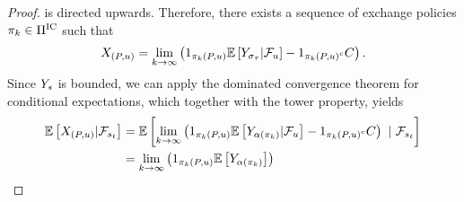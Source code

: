 \begin{proof}
    is directed upwards.
    Therefore, there exists a sequence of exchange policies 
    \(
        \exchangepolicy_k 
        \in\seticexchangepolicies
    \)
    such that 
    \begin{align*}
        \snellenvss{
            \rbr{
                \fixedpath,\nextexchange
            }
        }
        =
        \lim_{k\rightarrow\infty}
        \rbr{
            1_{
                \policyfollowspath{
                    \fixedpath,\nextexchange
                }{\exchangepolicy_k}
            }
            \EE\sbr{
                \rewardss{
                    \strategytt{\stoptime}
                }
                |
                \statefiltss{\nextexchange}
            }
            -
            1_{
                \policyfollowspath{
                    \fixedpath,\nextexchange
                }{\exchangepolicy_k}^c
            }
            \rewardbound 
        } .
    \end{align*}  
    Since $\rewards$ is bounded, we can apply the dominated convergence theorem for conditional expectations, which
    together with the tower property, yields
    \begin{align*}
        \EE\sbr{
            \snellenvss{
                \rbr{
                    \fixedpath,\nextexchange
                }
            }
            | 
            \statefiltss{\exchanget}
        }
        &=
        \EE\sbr{
            \lim_{k\rightarrow\infty}
            \rbr{
                1_{
                    \policyfollowspath{
                        \fixedpath,\nextexchange
                    }{\exchangepolicy_k}
                }
                \EE\sbr{
                    \rewardss{
                        \stopstateforpolicy{
                            \exchangepolicy_k
                        }
                    }
                    |
                    \statefiltss{\nextexchange}
                }
                -
                1_{
                    \policyfollowspath{
                        \fixedpath,\nextexchange
                    }{\exchangepolicy_k}^c
                }
                \rewardbound 
            }
            ~|~ 
            \statefiltss{\exchanget}
        }
        \\
        &=
        \lim_{k\rightarrow\infty}
        \rbr{
            1_{
                \policyfollowspath{
                    \fixedpath,\nextexchange
                }{\exchangepolicy_k}
            }
            \EE\sbr{
                \rewardss{
                    \stopstateforpolicy{
                        \exchangepolicy_k
}}}}
\end{align*}
\end{proof}
